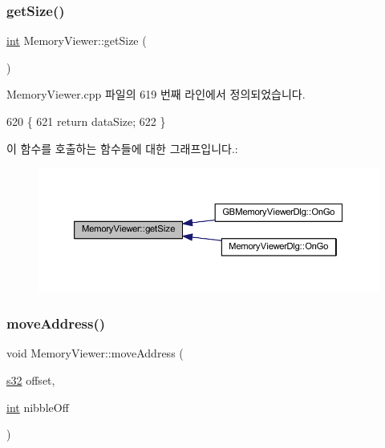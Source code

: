 \subsubsection{\texorpdfstring{get\+Size()}{getSize()}}
{\footnotesize\ttfamily \mbox{\hyperlink{_util_8cpp_a0ef32aa8672df19503a49fab2d0c8071}{int}} Memory\+Viewer\+::get\+Size (\begin{DoxyParamCaption}{ }\end{DoxyParamCaption})}



Memory\+Viewer.\+cpp 파일의 619 번째 라인에서 정의되었습니다.


\begin{DoxyCode}
620 \{
621   \textcolor{keywordflow}{return} dataSize;
622 \}
\end{DoxyCode}
이 함수를 호출하는 함수들에 대한 그래프입니다.\+:
\nopagebreak
\begin{figure}[H]
\begin{center}
\leavevmode
\includegraphics[width=350pt]{class_memory_viewer_a288ec6d61ae8687974786bf8d04a4e77_icgraph}
\end{center}
\end{figure}
\mbox{\label{class_memory_viewer_a0a371c925fc00dd78fedd8d21ebc8cdc}} 
\subsubsection{\texorpdfstring{move\+Address()}{moveAddress()}}
{\footnotesize\ttfamily void Memory\+Viewer\+::move\+Address (\begin{DoxyParamCaption}\item[{\mbox{\hyperlink{_system_8h_a0ce6887c26c1c49ad3be5710dd42bfd6}{s32}}}]{offset,  }\item[{\mbox{\hyperlink{_util_8cpp_a0ef32aa8672df19503a49fab2d0c8071}{int}}}]{nibble\+Off }\end{DoxyParamCaption})}




